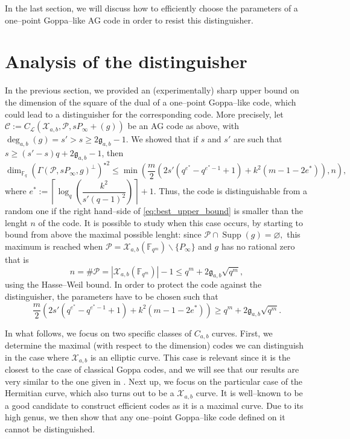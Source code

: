 \documentclass[a4paper]{amsart}
\theoremstyle{definition}
\theoremstyle{remark}
\newcommand{\calP}{\mathcal{P}}
\newcommand{\calL}{\mathcal{L}}
\newcommand{\calC}{\mathcal{C}}
\newcommand{\calX}{\mathcal{X}}
\newcommand{\fqm}{\mathbb{F}_{q^m}}
\newcommand{\fq}{\mathbb{F}_{q}}
\newcommand{\Supp}{\operatorname{Supp}}
\newcommand{\degab}[1]{\deg_{a,b}\left(#1\right)}
\begin{document}
In the last section, we will discuss how to efficiently choose the parameters of a one--point Goppa--like AG code in order to resist this distinguisher.

\section{Analysis of the distinguisher}\label{sec:analysis}

In the previous section, we provided an (experimentally) sharp upper bound on the dimension of the square of the dual of a one--point Goppa--like code, which could lead to a distinguisher for the corresponding code. More precisely, let $\calC := C_\calL(\calX_{a,b},\calP,sP_\infty +(g))$ be an AG code as above, with $\degab{g} = s'>s\geq 2\mathfrak{g}_{a,b}-1$. We showed that if $s$ and $s'$ are such that $s \geq (s'-s)q+2\mathfrak{g}_{a,b}-1$, then
\begin{equation} \label{eq:best_upper_bound}
\dim_{\fq} (\Gamma(\calP,sP_\infty,g)^{\perp})^{\star 2} \leq \min \left(\frac{m}{2}\left(2s'(q^{e^*}-q^{e^*-1}+1)+k^2(m-1-2e^*)  \right),n\right),
\end{equation}
where $e^* := \left\lceil \log_q\left(\dfrac{k^2}{s'(q-1)^2}\right)\right\rceil+1$. Thus, the code is distinguishable from a random one if the right hand--side of \eqref{eq:best_upper_bound} is smaller than the lenght $n$ of the code. It is possible to study when this case occurs, by starting to bound from above the maximal possible lenght: since $\calP \cap \Supp(g) = \varnothing,$ this maximum is reached when $\calP = \calX_{a,b}(\fqm) \backslash \{P_\infty\}$ and $g$ has no rational zero that is
$$n = \# \calP = |\calX_{a,b}(\fqm)|-1 \leq q^m+2\mathfrak{g}_{a,b}\sqrt{q^m},$$
using the Hasse--Weil bound. In order to protect the code against the distinguisher, the parameters have to be chosen such that 
\begin{equation} \label{eq:cond_not_to_distinguish}
\frac{m}{2}\left(2s'(q^{e^*}-q^{e^*-1}+1)+k^2(m-1-2e^*)  \right)\geq q^m+2\mathfrak{g}_{a,b}\sqrt{q^m}.
\end{equation}

In what follows, we focus on two specific classes of $C_{a,b}$ curves. First, we determine the maximal (with respect to the dimension) codes we can distinguish in the case where $\calX_{a,b}$ is an elliptic curve. This case is relevant since it is the closest to the case of classical Goppa codes, and we will see that our results are very similar to the one given in \cite{MT21}. Next up, we focus on the particular case of the Hermitian curve, which also turns out to be a $\calX_{a,b}$ curve. It is well--known to be a good candidate to construct efficient codes as it is a maximal curve. Due to its high genus, we then show that any one--point Goppa--like code defined on it cannot be distinguished.
\end{document}
